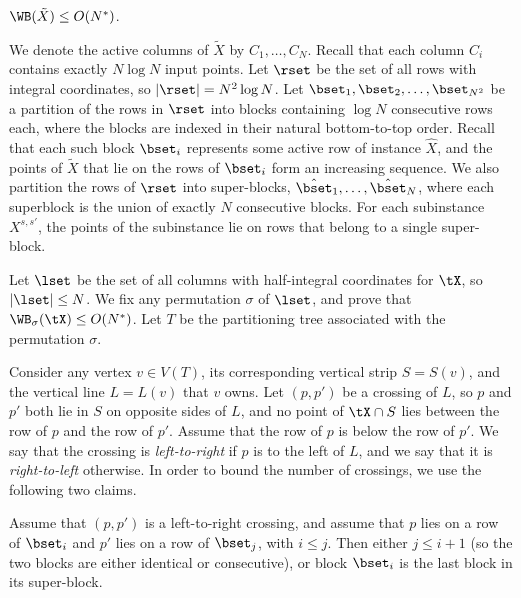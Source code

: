 \documentclass{toc}
\begin{document}
\begin{lemma}\label{lem: bounding vertical WB for compressed}
	 $\WB(\tilde X)\leq O(N^*)$.
\end{lemma}

We denote the active columns of $\tilde X$ by $C_1,\ldots,C_N$. 
Recall that each column $C_i$ contains exactly $N\log N$ input points. 
Let $\rset$ be the set of all rows with integral coordinates, so $|\rset|=N^2\log N$. Let $\bset_1,\bset_2,\ldots,\bset_{N^2}$ be a partition of the rows in $\rset$ into blocks containing $\log N$ consecutive rows each, where the blocks are indexed in their natural bottom-to-top order. Recall that each such block $\bset_i$ represents some active row of instance $\hat X$, and the points of $\tilde X$ that lie on the rows of $\bset_i$ form an increasing sequence. We also partition the rows of $\rset$ into super-blocks, $\hat \bset_1,\ldots,\hat \bset_N$, where each superblock is the union of exactly $N$ consecutive blocks. For each subinstance $X^{s,s'}$, the points of the subinstance lie on rows that belong to a single super-block.


Let $\lset$ be the set of all columns with half-integral coordinates for $\tX$, so $|\lset|\leq N$. We fix any permutation $\sigma$ of $\lset$, and prove that $\WB_{\sigma}(\tX)\leq O(N^*)$. Let $T$ be the partitioning tree associated with the permutation $\sigma$.

Consider any vertex $v\in V(T)$, its corresponding vertical strip $S=S(v)$, and the vertical line $L= L(v)$ that $v$ owns. 
Let $(p,p')$ be a crossing of $L$, so $p$ and $p'$ both lie in $S$ on opposite sides of $L$, and no point of $\tX\cap S$ lies between the row of $p$ and the row of $p'$. Assume that the row of $p$ is below the row of $p'$. We say that the crossing is \emph{left-to-right} if $p$ is to the left of $L$, and we say that it is \emph{right-to-left} otherwise. In order to bound the number of crossings, we use the following two claims.

\begin{claim}\label{claim: left to right crossing}
	Assume that $(p,p')$ is a left-to-right crossing, and assume that $p$ lies on a row of $\bset_i$ and $p'$ lies on a row of $\bset_j$, with $i\leq j$. Then either $j\leq i+1$ (so the two blocks are either identical or consecutive), or block $\bset_i$ is the last block in its super-block.
\end{claim}
\end{document}
